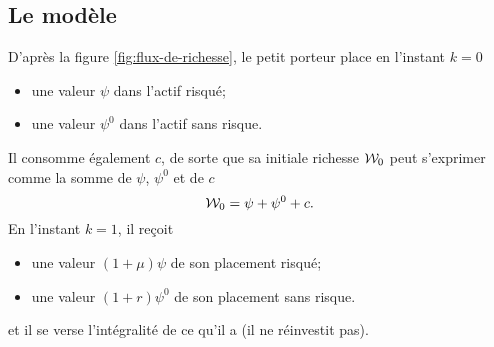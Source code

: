 \documentclass{article}
\numberwithin{equation}{section}
\begin{document}
\subsection{Le modèle}\label{sec:deux-periodes-model}

D'après la figure \ref{fig:flux-de-richesse}, le petit porteur place en l'instant $k = 0$
\begin{itemize}
\item une valeur $\psi$ dans l'actif risqué;
\item une valeur $\psi^0$ dans l'actif sans risque.
\end{itemize}
Il consomme également $c$, de sorte que sa initiale richesse $\mathcal{W}_0$ peut s'exprimer comme la somme de $\psi$, $\psi^0$ et de $c$
\begin{equation}\label{eq:conservation-zéro}
\mathcal{W}_0 = \psi + \psi^0 + c.
\end{equation}
En l'instant $k = 1$, il reçoit 
\begin{itemize}
\item une valeur $(1 + \mu)\psi$ de son placement risqué;
\item une valeur $(1 + r)\psi^0$ de son placement sans risque.
\end{itemize}
et il se verse l'intégralité de ce qu'il a (il ne réinvestit pas). \\
\end{document}

